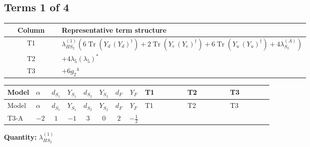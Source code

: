 \documentclass[8pt]{article}
\begin{document}
\begin{landscape}
\subsection*{Terms 1 of 4}
\begin{center}
\begin{tabular}{@{}c >{\raggedright\arraybackslash}p{0.82\linewidth}@{}}
\toprule
Column & Representative term structure \\
\midrule
T1 & \(\displaystyle {\lambda_{HS_2}^{(1)}} (6 \operatorname{Tr}\!\left({Y_d}\,\left({Y_d}\right)^{\dagger}\right)+2 \operatorname{Tr}\!\left({Y_e}\,\left({Y_e}\right)^{\dagger}\right)+6 \operatorname{Tr}\!\left({Y_u}\,\left({Y_u}\right)^{\dagger}\right)+4 {\lambda_{S_2}^{(A)}})\) \\
\midrule
T2 & \(\displaystyle +4 {\lambda_5} \left({\lambda_5}\right)^{*}\) \\
\midrule
T3 & \(\displaystyle +6 {g_2}^4\) \\
\midrule
\bottomrule
\end{tabular}
\end{center}
\smallskip
\tiny
\begin{longtable}{@{}llcccccc >{\raggedright\arraybackslash}p{0.21\linewidth} >{\raggedright\arraybackslash}p{0.21\linewidth} >{\raggedright\arraybackslash}p{0.21\linewidth}@{}}
\toprule
Model & $\alpha$ & $d_{S_1}$ & $Y_{S_1}$ & $d_{S_2}$ & $Y_{S_2}$ & $d_F$ & $Y_F$ & T1 & T2 & T3 \\
\midrule
\endfirsthead
\toprule
Model & $\alpha$ & $d_{S_1}$ & $Y_{S_1}$ & $d_{S_2}$ & $Y_{S_2}$ & $d_F$ & $Y_F$ & T1 & T2 & T3 \\
\midrule
\endhead
T3-A & $-2$ & $1$ & $-1$ & $3$ & $0$ & $2$ & $-\frac{1}{2}$ & \scriptsize\adjustbox{max width=\linewidth}{$\begin{gathered} {\lambda_{HS_2}^{(1)}} (6 \operatorname{Tr}\!\left({Y_d}\,\left({Y_d}\right)^{\dagger}\right)+2 \operatorname{Tr}\!\left({Y_e}\,\left({Y_e}\right)^{\dagger}\right)+6 \operatorname{Tr}\!\left({Y_u}\,\left({Y_u}\right)^{\dagger}\right)+4 {\lambda_{S_2}^{(A)}})\end{gathered}$} & \scriptsize\adjustbox{max width=\linewidth}{$\begin{gathered} +4 {\lambda_5} \left({\lambda_5}\right)^{*}\end{gathered}$} & \scriptsize\adjustbox{max width=\linewidth}{$\begin{gathered} +6 {g_2}^4\end{gathered}$} \\
\midrule
\bottomrule
\end{longtable}
\clearpage
\noindent\textbf{Quantity: }$\lambda_{HS_2}^{(1)}$\par\smallskip

\end{landscape}
\end{document}
